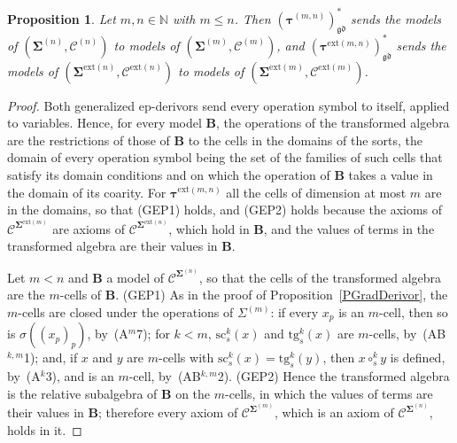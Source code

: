 \documentclass{amsart}
\theoremstyle{plain}
\newtheorem{proposition}[theorem]{Proposition}
\theoremstyle{definition}
\begin{document}
\begin{proposition}\label{PTruncExtDerivor}
Let $m,n\in\mathbb{N}$ with $m\leq n$. Then $(\boldsymbol{\tau}^{(m,n)})^{\ast}_{\mathfrak{gd}}$ sends the models of $(\mathbf{\Sigma}^{(n)},\mathcal{C}^{(n)})$ to models of $(\mathbf{\Sigma}^{(m)},\mathcal{C}^{(m)})$, and $(\boldsymbol{\tau}^{\mathrm{ext}(m,n)})^{\ast}_{\mathfrak{gd}}$ sends the models of $(\mathbf{\Sigma}^{\mathrm{ext}(n)},\mathcal{C}^{\mathrm{ext}(n)})$ to models of $(\mathbf{\Sigma}^{\mathrm{ext}(m)},\mathcal{C}^{\mathrm{ext}(m)})$.
\end{proposition}
\begin{proof}
Both generalized ep-derivors send every operation symbol to itself, applied to variables. Hence, for every model $\mathbf{B}$, the operations of the transformed algebra are the restrictions of those of $\mathbf{B}$ to the cells in the domains of the sorts, the domain of every operation symbol being the set of the families of such cells that satisfy its domain conditions and on which the operation of $\mathbf{B}$ takes a value in the domain of its coarity. For $\boldsymbol{\tau}^{\mathrm{ext}(m,n)}$ all the cells of dimension at most $m$ are in the domains, so that (GEP1) holds, and (GEP2) holds because the axioms of $\boldsymbol{\mathcal{C}}^{\mathbf{\Sigma}^{\mathrm{ext}(m)}}$ are axioms of $\boldsymbol{\mathcal{C}}^{\mathbf{\Sigma}^{\mathrm{ext}(n)}}$, which hold in $\mathbf{B}$, and the values of terms in the transformed algebra are their values in $\mathbf{B}$.

Let $m<n$ and $\mathbf{B}$ a model of $\boldsymbol{\mathcal{C}}^{\mathbf{\Sigma}^{(n)}}$, so that the cells of the transformed algebra are the $m$-cells of $\mathbf{B}$. (GEP1) As in the proof of Proposition~\ref{PGradDerivor}, the $m$-cells are closed under the operations of $\Sigma^{(m)}$: if every $x_{p}$ is an $m$-cell, then so is $\sigma((x_{p})_{p})$, by~(A$^{m}$7); for $k<m$, $\mathrm{sc}^{k}_{s}(x)$ and $\mathrm{tg}^{k}_{s}(x)$ are $m$-cells, by~(AB$^{k,m}$1); and, if $x$ and $y$ are $m$-cells with $\mathrm{sc}^{k}_{s}(x)=\mathrm{tg}^{k}_{s}(y)$, then $x\circ^{k}_{s}y$ is defined, by~(A$^{k}$3), and is an $m$-cell, by~(AB$^{k,m}$2). (GEP2) Hence the transformed algebra is the relative subalgebra of $\mathbf{B}$ on the $m$-cells, in which the values of terms are their values in $\mathbf{B}$; therefore every axiom of $\boldsymbol{\mathcal{C}}^{\mathbf{\Sigma}^{(m)}}$, which is an axiom of $\boldsymbol{\mathcal{C}}^{\mathbf{\Sigma}^{(n)}}$, holds in it.
\end{proof}
\end{document}
